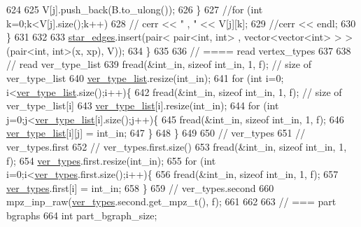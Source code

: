 \begin{DoxyCode}
624 
625         V[j].push\_back(B.to\_ulong());
626       \}
627       \textcolor{comment}{//for (int k=0;k<V[j].size();k++)}
628       \textcolor{comment}{//  cerr << " , " << V[j][k];}
629       \textcolor{comment}{//cerr << endl;}
630     \}
631 
632 
633     \hyperlink{classmarked__graph__compressed_a7df5779d313486644132bd816937f532}{star\_edges}.insert(pair< pair<int, int> , vector<vector<int> > > (pair<int, int>(x, xp), V));
634   \}
635 
636   \textcolor{comment}{// ==== read vertex\_types}
637 
638   \textcolor{comment}{// read ver\_type\_list}
639   fread(&int\_in, \textcolor{keyword}{sizeof} int\_in, 1, f); \textcolor{comment}{// size of ver\_type\_list}
640   \hyperlink{classmarked__graph__compressed_af2e3e55223d436628a02758dfae88493}{ver\_type\_list}.resize(int\_in);
641   \textcolor{keywordflow}{for} (\textcolor{keywordtype}{int} i=0; i<\hyperlink{classmarked__graph__compressed_af2e3e55223d436628a02758dfae88493}{ver\_type\_list}.size();i++)\{
642     fread(&int\_in, \textcolor{keyword}{sizeof} int\_in, 1, f); \textcolor{comment}{// size of ver\_type\_list[i]}
643     \hyperlink{classmarked__graph__compressed_af2e3e55223d436628a02758dfae88493}{ver\_type\_list}[i].resize(int\_in);
644     \textcolor{keywordflow}{for} (\textcolor{keywordtype}{int} j=0;j<\hyperlink{classmarked__graph__compressed_af2e3e55223d436628a02758dfae88493}{ver\_type\_list}[i].size();j++)\{
645       fread(&int\_in, \textcolor{keyword}{sizeof} int\_in, 1, f);
646       \hyperlink{classmarked__graph__compressed_af2e3e55223d436628a02758dfae88493}{ver\_type\_list}[i][j] = int\_in;
647     \}
648   \}
649 
650   \textcolor{comment}{// ver\_types}
651   \textcolor{comment}{// ver\_types.first}
652   \textcolor{comment}{// ver\_types.first.size()}
653   fread(&int\_in, \textcolor{keyword}{sizeof} int\_in, 1, f);
654   \hyperlink{classmarked__graph__compressed_af446cc5e23c241a92b76642fd5ebc403}{ver\_types}.first.resize(int\_in);
655   \textcolor{keywordflow}{for} (\textcolor{keywordtype}{int} i=0;i<\hyperlink{classmarked__graph__compressed_af446cc5e23c241a92b76642fd5ebc403}{ver\_types}.first.size();i++)\{
656     fread(&int\_in, \textcolor{keyword}{sizeof} int\_in, 1, f);
657     \hyperlink{classmarked__graph__compressed_af446cc5e23c241a92b76642fd5ebc403}{ver\_types}.first[i] = int\_in;
658   \}
659   \textcolor{comment}{// ver\_types.second}
660   mpz\_inp\_raw(\hyperlink{classmarked__graph__compressed_af446cc5e23c241a92b76642fd5ebc403}{ver\_types}.second.get\_mpz\_t(), f);
661 
662 
663   \textcolor{comment}{// === part bgraphs}
664   \textcolor{keywordtype}{int} part\_bgraph\_size;

\end{DoxyCode}
